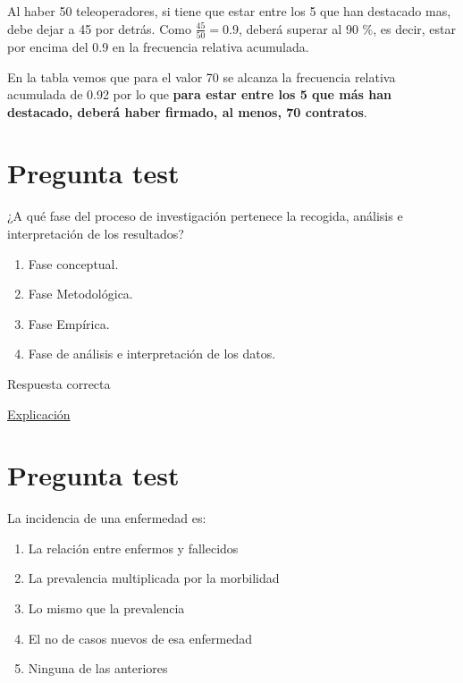 \documentclass[
]{book}
\providecommand{\tightlist}{%
  \setlength{\itemsep}{0pt}\setlength{\parskip}{0pt}}
\begin{document}
Al haber 50 teleoperadores, si tiene que estar entre los 5 que han destacado mas, debe dejar a 45 por detrás. Como \(\frac{45}{50}=0.9\), deberá superar al 90 \%, es decir, estar por encima del 0.9 en la frecuencia relativa acumulada.

En la tabla vemos que para el valor 70 se alcanza la frecuencia relativa acumulada de 0.92 por lo que \textbf{para estar entre los 5 que más han destacado, deberá haber firmado, al menos, 70 contratos}.

\hypertarget{pregunta-test-5}{%
\section{Pregunta test}\label{pregunta-test-5}}

¿A qué fase del proceso de investigación pertenece la recogida, análisis e interpretación de los resultados?

\begin{enumerate}
\def\labelenumi{\alph{enumi})}
\tightlist
\item
  Fase conceptual.
\item
  Fase Metodológica.
\item
  Fase Empírica.
\item
  Fase de análisis e interpretación de los datos.
\end{enumerate}

Respuesta correcta

\href{https://www.salusplay.com/apuntes/apuntes-metodologia-de-la-investigacion/tema-4-el-proceso-de-investigacion-fases-de-realizacion-de-una-investigacion-cientifica/2}{Explicación}

\hypertarget{pregunta-test-6}{%
\section{Pregunta test}\label{pregunta-test-6}}

La incidencia de una enfermedad es:

\begin{enumerate}
\def\labelenumi{\alph{enumi})}
\tightlist
\item
  La relación entre enfermos y fallecidos
\item
  La prevalencia multiplicada por la morbilidad
\item
  Lo mismo que la prevalencia
\item
  El no de casos nuevos de esa enfermedad
\item
  Ninguna de las anteriores
\end{enumerate}
\end{document}
